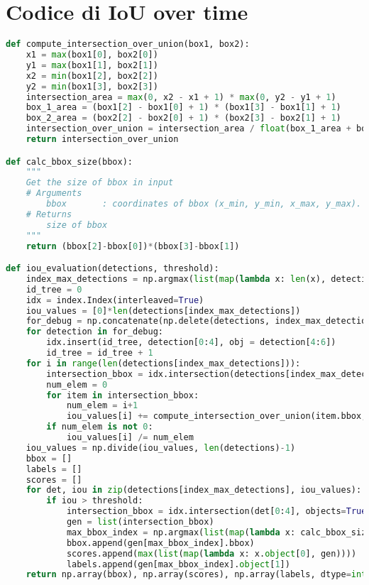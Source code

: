 \chapter{Codice di IoU over time}
\begin{lstlisting}[caption={Algoritmo di IoU over time in Python}, language=Python, basicstyle=\tiny,label=code:ioutime]
def compute_intersection_over_union(box1, box2):
    x1 = max(box1[0], box2[0])
    y1 = max(box1[1], box2[1])
    x2 = min(box1[2], box2[2])
    y2 = min(box1[3], box2[3])
    intersection_area = max(0, x2 - x1 + 1) * max(0, y2 - y1 + 1)
    box_1_area = (box1[2] - box1[0] + 1) * (box1[3] - box1[1] + 1)
    box_2_area = (box2[2] - box2[0] + 1) * (box2[3] - box2[1] + 1)
    intersection_over_union = intersection_area / float(box_1_area + box_2_area - intersection_area)
    return intersection_over_union

def calc_bbox_size(bbox):
    """
    Get the size of bbox in input
    # Arguments
        bbox       : coordinates of bbox (x_min, y_min, x_max, y_max).
    # Returns
        size of bbox
    """
    return (bbox[2]-bbox[0])*(bbox[3]-bbox[1])

def iou_evaluation(detections, threshold):
    index_max_detections = np.argmax(list(map(lambda x: len(x), detections)))
    id_tree = 0
    idx = index.Index(interleaved=True)
    iou_values = [0]*len(detections[index_max_detections])
    for_debug = np.concatenate(np.delete(detections, index_max_detections, axis = 0))
    for detection in for_debug:
        idx.insert(id_tree, detection[0:4], obj = detection[4:6])
        id_tree = id_tree + 1
    for i in range(len(detections[index_max_detections])):
        intersection_bbox = idx.intersection(detections[index_max_detections][i][0:4], objects=True)
        num_elem = 0
        for item in intersection_bbox:
            num_elem = i+1
            iou_values[i] += compute_intersection_over_union(item.bbox, detections[index_max_detections][i][0:4])
        if num_elem is not 0:
            iou_values[i] /= num_elem
    iou_values = np.divide(iou_values, len(detections)-1)
    bbox = []
    labels = []
    scores = []
    for det, iou in zip(detections[index_max_detections], iou_values):
        if iou > threshold:
            intersection_bbox = idx.intersection(det[0:4], objects=True)
            gen = list(intersection_bbox)
            max_bbox_index = np.argmax(list(map(lambda x: calc_bbox_size(x), list(map(lambda x: x.bbox, gen)))))
            bbox.append(gen[max_bbox_index].bbox)
            scores.append(max(list(map(lambda x: x.object[0], gen))))
            labels.append(gen[max_bbox_index].object[1])
    return np.array(bbox), np.array(scores), np.array(labels, dtype=int)
\end{lstlisting}

